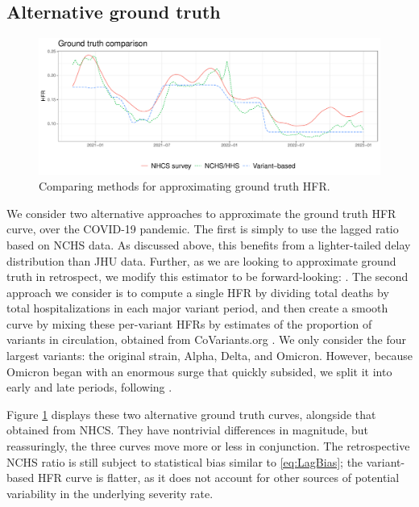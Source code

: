 \documentclass{article}
\renewcommand{\hat}{\widehat} %
\begin{document}
\subsection{Alternative ground truth}
\label{apx:alt_gt}

\begin{figure}[b!]
\centering
\includegraphics[width=\linewidth]{Figures/Real/ApproxGT.pdf}
\caption{Comparing methods for approximating ground truth HFR.}
\label{fig:approxGT}
\end{figure}

We consider two alternative approaches to approximate the ground truth HFR
curve, over the COVID-19 pandemic. The first is simply to use the lagged ratio
based on NCHS data. As discussed above, this benefits from a lighter-tailed
delay distribution than JHU data. Further, as we are looking to approximate
ground truth in retrospect, we modify this estimator to be forward-looking:
\smash{$\hat{p}_t^\ell = Y_{t+\ell} / X_t$}. The second approach we consider is
to compute a single HFR by dividing total deaths by total hospitalizations in
each major variant period,  
and then create a smooth curve by mixing these per-variant HFRs by estimates
of the proportion of variants in circulation, obtained from CoVariants.org
\citep{Hodcroft2021}. We only consider the four largest variants: the original
strain, Alpha, Delta, and Omicron. However, because Omicron began with an
enormous surge that quickly subsided, we split it into early and late periods,
following \citep{adjei2022mortality}.     

Figure \ref{fig:approxGT} displays these two alternative ground truth curves,
alongside that obtained from NHCS. They have nontrivial differences in
magnitude, but reassuringly, the three curves move more or less in
conjunction. The retrospective NCHS ratio is still subject to statistical bias
similar to \eqref{eq:LagBias}; the variant-based HFR curve is flatter, as it 
does not account for other sources of potential variability in the underlying
severity rate.   
\end{document}
